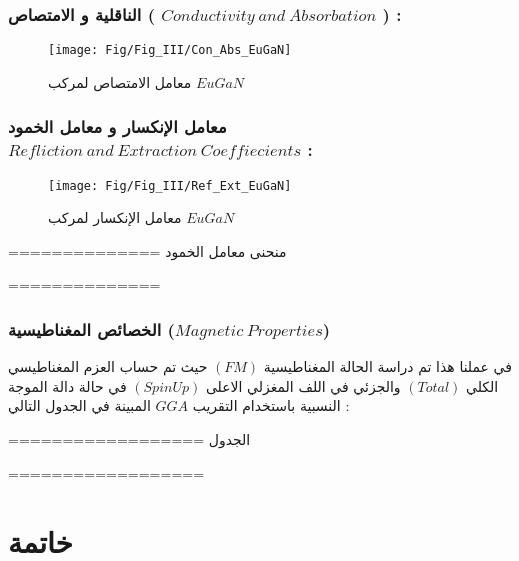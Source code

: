 \subsection*{ الناقلية و الامتصاص ( $ Conductivity~and~Absorbation $ ) : }

\begin{figure}[h!]
	\centering
	\texttt{[image: Fig/Fig\_III/Con\_Abs\_EuGaN]}
	\caption{ معامل الامتصاص لمركب $  EuGaN $ }
	\label{fig:conabseugan}
\end{figure}
\FloatBarrier

\subsection*{ معامل الإنكسار و معامل الخمود $ Refliction~and~Extraction~Coeffiecients $ : }
\begin{figure}[h!]
	\centering
	\texttt{[image: Fig/Fig\_III/Ref\_Ext\_EuGaN]}
	\caption{ معامل الإنكسار لمركب $  EuGaN $  }
	\label{fig:refexteugan}
\end{figure}
\FloatBarrier

==============
منحنى معامل الخمود

==============
\subsection{ الخصائص المغناطيسية ($ Magnetic~Properties $)  }

في عملنا هذا تم دراسة الحالة المغناطيسية $ (FM) $ حيث تم حساب العزم المغناطيسي الكلي $ (Total) $ والجزئي في اللف المغزلي الاعلى $ ( Spin Up ) $ في حالة دالة الموجة النسبية باستخدام التقريب $ GGA $ المبينة في الجدول التالي :

==================
الجدول

==================


\chapter*{  خاتمة }